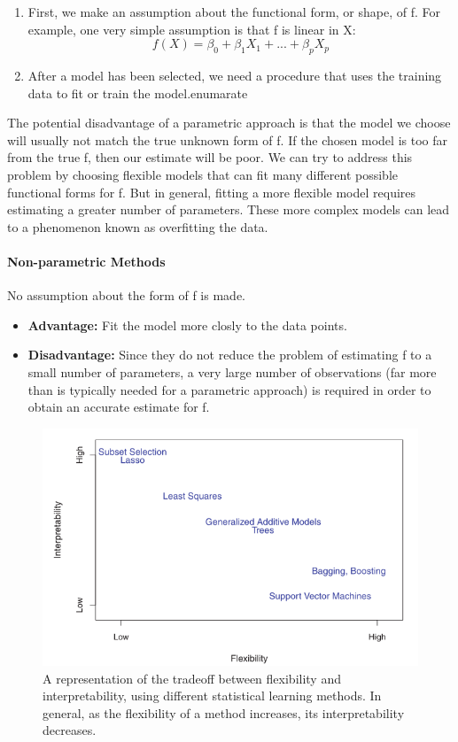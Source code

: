 \begin{enumerate}
    \item  First, we make an assumption about the functional form, or shape, of f. For example, one very simple assumption is that f is linear in X: \[ f(X) = \beta_0 + \beta_1 X_1 + ... + \beta_p X_p \]
    \item  After a model has been selected, we need a procedure that uses the training data to fit or train the model.enumarate
\end{enumerate}

The potential disadvantage of a parametric approach is that the model we choose will usually not match the true unknown form of f. If the chosen model is too far from the true f, then our estimate will be poor. We can try to address this problem by choosing flexible models that can fit many different possible functional forms for f. But in general, fitting a more flexible model requires estimating a greater number of parameters. These more complex models can lead to a phenomenon known as overfitting the data.

\paragraph{Non-parametric Methods}
No assumption about the form of f is made. 
\begin{itemize}
    \item \textbf{Advantage:} Fit the model more closly to the data points.
    \item \textbf{Disadvantage:} Since they do not reduce the problem of estimating f to a
small number of parameters, a very large number of observations (far more
than is typically needed for a parametric approach) is required in order to
obtain an accurate estimate for f.
\end{itemize}

\begin{figure}[!ht]
\centering
\includegraphics[scale=0.7]{src/StatisticalLearning/Trade-Off_Prediction-Interpretability.PNG}
\caption{A representation of the tradeoff between flexibility and interpretability, using different statistical learning methods. In general, as the flexibility of a method increases, its interpretability decreases.}
\end{figure}


